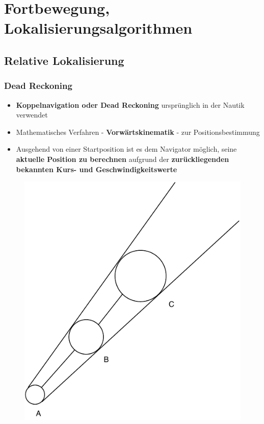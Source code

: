\chapter{Fortbewegung, Lokalisierungsalgorithmen}
\section{Relative Lokalisierung}
\subsection{Dead Reckoning}
\begin{itemize}
	\item \textbf{Koppelnavigation oder Dead Reckoning} ursprünglich in der Nautik verwendet
	\item Mathematisches Verfahren - \textbf{Vorwärtskinematik} - zur Positionsbestimmung
	\item Ausgehend von einer Startposition ist es dem Navigator möglich, seine \textbf{aktuelle Position zu berechnen} aufgrund der \textbf{zurückliegenden bekannten Kurs- und Geschwindigkeitswerte}
\end{itemize}
\begin{figure}[H]
	\begin{center}
		\includegraphics[scale=0.7]{Resources/PDF/deadreckoning.pdf}
		\caption{}
		\label{fig:PDF/deadreckoning.pdf}
	\end{center}
\end{figure}
